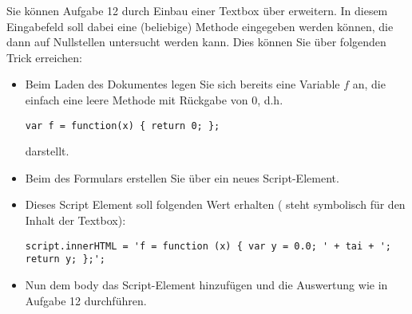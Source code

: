%
\par Sie können Aufgabe 12 durch Einbau einer Textbox über  erweitern. In diesem Eingabefeld soll dabei eine (beliebige) Methode eingegeben werden können, die dann auf Nullstellen untersucht werden kann. Dies können Sie über folgenden Trick erreichen:
%
\begin{itemize}
\item Beim Laden des Dokumentes legen Sie sich bereits eine Variable $f$ an, die einfach eine leere Methode mit Rückgabe von $0$, d.h. 
%
\begin{lstlisting}
var f = function(x) { return 0; };
\end{lstlisting}
%
darstellt.
\item Beim  des Formulars erstellen Sie über  ein neues Script-Element.
\item Dieses Script Element soll folgenden  Wert erhalten ( steht symbolisch für den Inhalt der Textbox):
%
\begin{lstlisting}
script.innerHTML = 'f = function (x) { var y = 0.0; ' + tai + '; return y; };';
\end{lstlisting}
%
\item Nun dem body das Script-Element hinzufügen und die Auswertung wie in Aufgabe 12 durchführen.
\end{itemize}